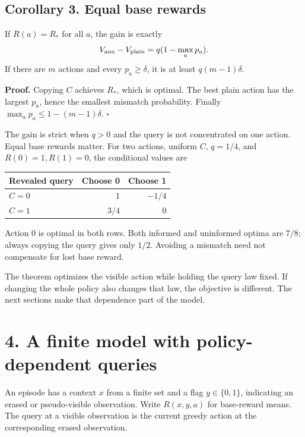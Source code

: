 \documentclass[
  11pt,
  letterpaper,
]{article}
\newcounter{none} %
\begin{document}
\subsection{Corollary 3. Equal base
rewards}\label{corollary-3.-equal-base-rewards}

If \(R(a)=R_*\) for all \(a\), the gain is exactly \[
                   V_{\rm ann}-V_{\rm plain}
                         =q(1-\max_a p_a).
\] If there are \(m\) actions and every \(p_a\geq\delta\), it is at
least \(q(m-1)\delta\).

\textbf{Proof.} Copying \(C\) achieves \(R_*\), which is optimal. The
best plain action has the largest \(p_a\), hence the smallest mismatch
probability. Finally \(\max_a p_a\leq1-(m-1)\delta\). \hfill\(\square\)

The gain is strict when \(q>0\) and the query is not concentrated on one
action. Equal base rewards matter. For two actions, uniform \(C\),
\(q=1/4\), and \(R(0)=1,R(1)=0\), the conditional values are

{\def\LTcaptype{none} %
\begin{longtable}[]{@{}lrr@{}}
\toprule\noalign{}
Revealed query & Choose 0 & Choose 1 \\
\midrule\noalign{}
\endhead
\bottomrule\noalign{}
\endlastfoot
\(C=0\) & \(1\) & \(-1/4\) \\
\(C=1\) & \(3/4\) & \(0\) \\
\end{longtable}
}

Action 0 is optimal in both rows. Both informed and uninformed optima
are \(7/8\); always copying the query gives only \(1/2\). Avoiding a
mismatch need not compensate for lost base reward.

The theorem optimizes the visible action while holding the query law
fixed. If changing the whole policy also changes that law, the objective
is different. The next sections make that dependence part of the model.

\section{4. A finite model with policy-dependent
queries}\label{a-finite-model-with-policy-dependent-queries}

An episode has a context \(x\) from a finite set and a flag
\(y\in\{0,1\}\), indicating an erased or pseudo-visible observation.
Write \(R(x,y,a)\) for base-reward means. The query at a visible
observation is the current greedy action at the corresponding erased
observation.
\end{document}
